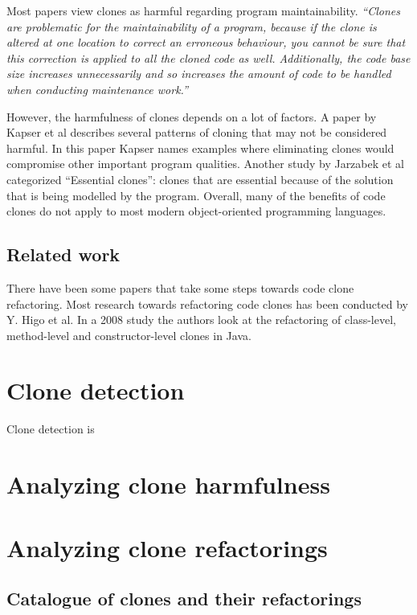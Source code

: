 \documentclass{report}
\theoremstyle{definition}
\theoremstyle{remark}
\begin{document}
Most papers view clones as harmful regarding program maintainability. \textit{``Clones are problematic for the maintainability of a program, because if the clone is altered at one location to correct an erroneous behaviour, you cannot be sure that this correction is applied to all the cloned code as well. Additionally, the code base size increases unnecessarily and so increases the amount of code to be handled when conducting maintenance work.''} \cite{ostberg2014automatically}

However, the harmfulness of clones depends on a lot of factors. A paper by Kapser et al \cite{kapser2006cloning} describes several patterns of cloning that may not be considered harmful. In this paper Kapser names examples where eliminating clones would compromise other important program qualities. Another study by Jarzabek et al \cite{jarzabek2010clones} categorized ``Essential clones'': clones that are essential because of the solution that is being modelled by the program. Overall, many of the benefits of code clones do not apply to most modern object-oriented programming languages.

\section{Related work}
There have been some papers that take some steps towards code clone refactoring. Most research towards refactoring code clones has been conducted by Y. Higo et al. In a 2008 study \cite{higo2008metric} the authors look at the refactoring of class-level, method-level and constructor-level clones in Java.

\chapter{Clone detection}
Clone detection is

\chapter{Analyzing clone harmfulness}


\chapter{Analyzing clone refactorings}


\section{Catalogue of clones and their refactorings}



\newpage


\end{document}
